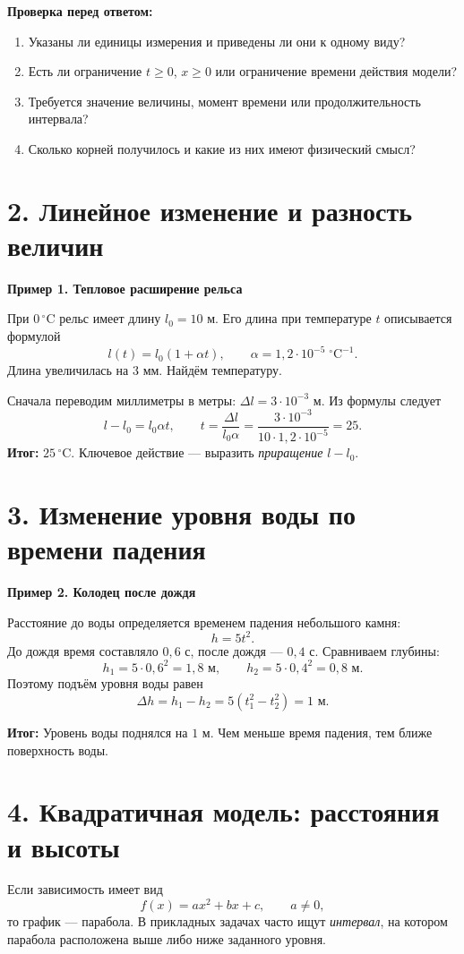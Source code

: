\documentclass[a4paper,12pt]{article}
\newcommand{\idea}[1]{\textcolor{darkaccent}{\textbf{#1}}}
\newcommand{\result}[1]{\textcolor{darkaccent}{\textbf{Итог:}} #1}
\newcommand{\ex}[2]{\vspace{4pt}\noindent\textcolor{darkaccent}{\textbf{Пример #1. #2}}\par\nopagebreak[3]}
\newcommand{\sectionline}{\par\vspace{-1mm}{\color{accent}\hrule height .45pt}\vspace{4mm}}
\newcommand{\sect}[2]{\section*{\textcolor{darkaccent}{#1. #2}}\sectionline}
\begin{document}
\idea{Проверка перед ответом:}
\begin{enumerate}
\item Указаны ли единицы измерения и приведены ли они к одному виду?
\item Есть ли ограничение $t\ge0$, $x\ge0$ или ограничение времени действия модели?
\item Требуется значение величины, момент времени или продолжительность интервала?
\item Сколько корней получилось и какие из них имеют физический смысл?
\end{enumerate}

\sect{2}{Линейное изменение и разность величин}
\ex{1}{Тепловое расширение рельса}
При $0\,^{\circ}\mathrm{C}$ рельс имеет длину $l_0=10$ м. Его длина при температуре $t$ описывается формулой
\[
 l(t)=l_0(1+\alpha t),\qquad \alpha=1{,}2\cdot10^{-5}\;^{\circ}\mathrm{C}^{-1}.
\]
Длина увеличилась на $3$ мм. Найдём температуру.

Сначала переводим миллиметры в метры: $\Delta l=3\cdot10^{-3}$ м. Из формулы следует
\[
 l-l_0=l_0\alpha t,\qquad
 t=\frac{\Delta l}{l_0\alpha}
 =\frac{3\cdot10^{-3}}{10\cdot1{,}2\cdot10^{-5}}=25.
\]
\result{$25\,^{\circ}\mathrm{C}$. Ключевое действие --- выразить \emph{приращение} $l-l_0$.}

\clearpage
\sect{3}{Изменение уровня воды по времени падения}
\ex{2}{Колодец после дождя}
Расстояние до воды определяется временем падения небольшого камня:
\[
 h=5t^2.
\]
До дождя время составляло $0{,}6$ с, после дождя --- $0{,}4$ с. Сравниваем глубины:
\[
 h_1=5\cdot0{,}6^2=1{,}8\text{ м},\qquad
 h_2=5\cdot0{,}4^2=0{,}8\text{ м}.
\]
Поэтому подъём уровня воды равен
\[
 \Delta h=h_1-h_2=5(t_1^2-t_2^2)=1\text{ м}.
\]
\begin{center}
\end{center}
\result{Уровень воды поднялся на $1$ м. Чем меньше время падения, тем ближе поверхность воды.}

\sect{4}{Квадратичная модель: расстояния и высоты}
Если зависимость имеет вид
\[
 f(x)=ax^2+bx+c,\qquad a\ne0,
\]
то график --- парабола. В прикладных задачах часто ищут \emph{интервал}, на котором парабола расположена выше либо ниже заданного уровня.
\end{document}
